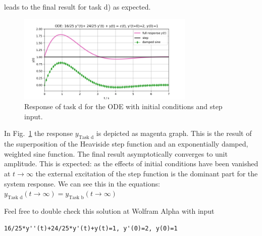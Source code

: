 leads to the final result for task d) as expected.
%
\begin{figure}[b!]
\centering
\includegraphics[width=0.75\textwidth]{../laplace_transform/response_full}
\caption{Response of task d for the ODE with initial conditions and step input.}
\label{fig:response_full}
\end{figure}
%
In Fig.~\ref{fig:response_full} the response $y_\text{Task d} $ is depicted as
magenta graph. This is the result of the superposition of the Heaviside step
function and an exponentially damped, weighted sine function.
The final result asymptotically converges to unit amplitude.
%
This is expected: as the effects of initial conditions have been vanished at $t\to\infty$
the external excitation of the step function is the dominant part for the system
response.
%
We can see this in the equations: $y_\text{Task d}(t\to\infty) = y_\text{Task b}(t\to\infty)$

Feel free to double check this solution at Wolfram Alpha with input
\begin{verbatim}
16/25*y''(t)+24/25*y'(t)+y(t)=1, y'(0)=2, y(0)=1
\end{verbatim}





